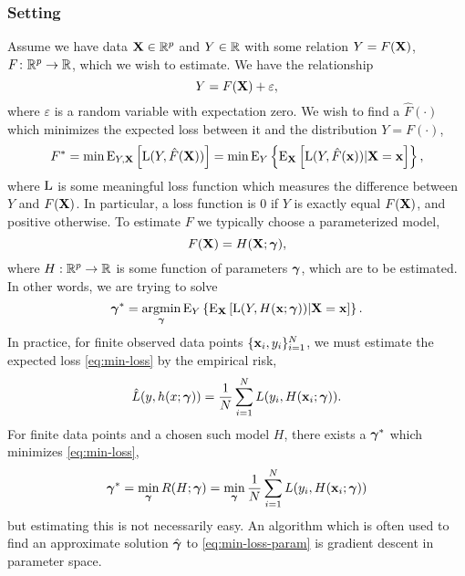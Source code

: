 \subsubsection{Setting}
Assume we have data $\mathbf{X}\in\mathbb{R}^p$ and $Y\in\mathbb{R}$ with some relation $Y=F(\mathbf{X})$, $F\colon\mathbb{R}^p\to\mathbb{R}$, which we wish to estimate. We have the relationship
\begin{equation*}
    Y=F(\mathbf{X})+\varepsilon,
\end{equation*}
where $\varepsilon$ is a random variable with expectation zero. We wish to find a $\hat{F}(\cdot)$ which minimizes the expected loss between it and the distribution $Y=F(\cdot)$,
\begin{equation}\label{eq:min-loss}
    F^*=\min\operatorname{E}_{Y,\mathbf{X}}\left[\operatorname{L}(Y,\hat{F}(\mathbf{X}))\right]=\min\operatorname{E}_Y\left\{\operatorname{E}_{\mathbf{X}}\left[\operatorname{L}(Y,\hat{F}(\mathbf{x}))|\mathbf{X}=\mathbf{x}\right]\right\},
\end{equation}
where $\operatorname{L}$ is some meaningful loss function which measures the difference between $Y$ and $F(\mathbf{X})$. In particular, a loss function is 0 if $Y$ is exactly equal $F(\mathbf{X})$, and positive otherwise. To estimate $F$ we typically choose a parameterized model,
\begin{equation}
    F(\mathbf{X})=H(\mathbf{X};\boldsymbol{\gamma}),
\end{equation}
where $H:\mathbb{R}^p\to\mathbb{R}$ is some function of parameters $\boldsymbol{\gamma}$, which are to be estimated. In other words, we are trying to solve
\begin{equation}\label{eq:}
    \boldsymbol{\gamma}^*=\operatorname*{argmin}_{\boldsymbol{\gamma}}\operatorname{E}_Y\left\{\operatorname{E}_{\mathbf{X}}\left[\operatorname{L}(Y,H(\mathbf{x};\boldsymbol{\gamma}))|\mathbf{X}=\mathbf{x}\right]\right\}.
\end{equation}
In practice, for finite observed data points $\{\mathbf{x}_i,y_i\}_{i=1}^N$, we must estimate the expected loss \eqref{eq:min-loss} by the empirical risk,
\begin{equation}\label{eq:emp-risk}
    \hat{L}(y,h(x;\boldsymbol{\gamma}))=\frac{1}{N}\sum_{i=1}^NL(y_i,H(\mathbf{x}_i;\boldsymbol{\gamma})).
\end{equation}
For finite data points and a chosen such model $H$, there exists a $\boldsymbol{\gamma}^*$ which minimizes \eqref{eq:min-loss},
\begin{equation}\label{eq:min-loss-param}
    \boldsymbol{\gamma}^*=\min_{\boldsymbol{\gamma}} R(H;\boldsymbol{\gamma})=\min_{\boldsymbol{\gamma}}\frac{1}{N}\sum_{i=1}^NL(y_i,H(\mathbf{x}_i;\boldsymbol{\gamma}))
\end{equation}
but estimating this is not necessarily easy. An algorithm which is often used to find an approximate solution $\hat{\boldsymbol{\gamma}}$ to \ref{eq:min-loss-param} is gradient descent in parameter space.

